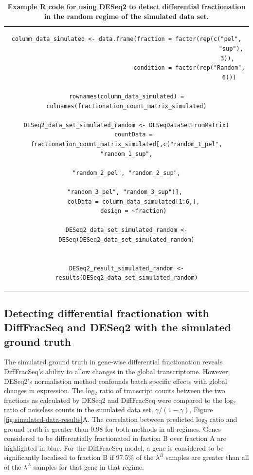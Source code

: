 \documentclass[../main.tex]{subfiles}
\begin{document}
\makeatletter
\renewcommand{\fnum@table}{Listing \thetable}
\makeatother

\begin{table}
\begin{tabular}{c}
\begin{lstlisting}[style=mystyle, language=DESeq]
column_data_simulated <- data.frame(fraction = factor(rep(c("pel",
                                                            "sup"),
                                                          3)),
                                    condition = factor(rep("Random",
                                                           6)))

rownames(column_data_simulated) = colnames(fractionation_count_matrix_simulated)

DESeq2_data_set_simulated_random <- DESeqDataSetFromMatrix(
    countData = fractionation_count_matrix_simulated[,c("random_1_pel", "random_1_sup",
                                                        "random_2_pel", "random_2_sup",
                                                        "random_3_pel", "random_3_sup")], 
    colData = column_data_simulated[1:6,],
    design = ~fraction)

DESeq2_data_set_simulated_random <- DESeq(DESeq2_data_set_simulated_random)


DESeq2_result_simulated_random <- results(DESeq2_data_set_simulated_random)
\end{lstlisting} \\
\end{tabular}
\caption[DESeq2 example R code]{\textbf{Example R code for using DESeq2 to detect differential fractionation in the random regime of the simulated data set.}}
\label{tab:DESeq2-r-code}
\end{table}

\makeatletter
\renewcommand{\fnum@table}{Table \thetable}
\makeatother

\subsection{Detecting differential fractionation with DiffFracSeq and DESeq2 with the simulated ground truth}

The simulated ground truth in gene-wise differential fractionation reveals DiffFracSeq's ability to allow changes in the global transcriptome.
However, DESeq2's normalistion method confounds batch specific effects with global changes in expression.
The log$_2$ ratio of transcript counts between the two fractions as calculated by DESeq2 and DiffFracSeq were compared to the log$_2$ ratio of noiseless counts in the simulated data set, $\gamma/(1-\gamma)$, Figure \ref{fig:simulated-data-results}A.
The correlation between predicted log$_2$ ratio and ground truth is greater than 0.98 for both methods in all regimes. 
Genes considered to be differentially fractionated in faction B over fraction A are highlighted in blue.
For the DiffFracSeq model, a gene is considered to be significantly localised to fraction B if 97.5\% of the $\lambda^{B}$ samples are greater than all of the $\lambda^{A}$ samples for that gene in that regime.
\end{document}
